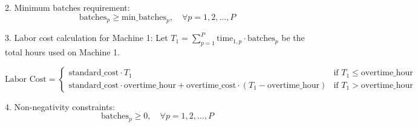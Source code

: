 \documentclass{article}
\begin{document}
2. Minimum batches requirement:
\[
\text{batches}_{p} \geq \text{min\_batches}_{p}, \quad \forall p = 1, 2, \ldots, P
\]

3. Labor cost calculation for Machine 1:
Let \( T_1 = \sum_{p=1}^{P} \text{time}_{1,p} \cdot \text{batches}_{p} \) be the total hours used on Machine 1.

\[
\text{Labor Cost} =
\begin{cases}
\text{standard\_cost} \cdot T_1 & \text{if } T_1 \leq \text{overtime\_hour} \\
\text{standard\_cost} \cdot \text{overtime\_hour} + \text{overtime\_cost} \cdot (T_1 - \text{overtime\_hour}) & \text{if } T_1 > \text{overtime\_hour}
\end{cases}
\]

4. Non-negativity constraints:
\[
\text{batches}_{p} \geq 0, \quad \forall p = 1, 2, \ldots, P
\]
\end{document}
